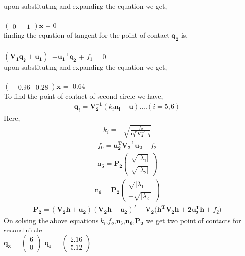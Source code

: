 \documentclass[journal,12pt,twocolumn]{IEEEtran}
\newcommand{\myvec}[1]{\ensuremath{\begin{pmatrix}#1\end{pmatrix}}}
\let\vec\mathbf
\begin{document}
upon substituting and expanding the equation we get, \\ \\
\hspace*{2cm}$\myvec{0 & -1}\vec{x}$ = 0 \\

finding the equation of tangent for the point of contact $\vec{q_2}$ is, \\ \\
\hspace*{2cm}$(\vec{V_1}\vec{q_2}+\vec{u_1})^{\top}$+$\vec{u_1}^{\top}\vec{q_2}$ + $f_1$ = 0 \\

upon substituting and expanding the equation we get, \\ \\
\hspace*{2cm}$\myvec{-0.96 & 0.28}\vec{x}$ = -0.64 \\

To find the point of contact of second circle we have, \\
\begin{align}
\boxed{\vec{q}_i = \vec{V_2^{-1}}(k_i\vec{n_i-u})}....(i = 5,6) 
\end{align}
Here, 
\begin{align}
k_i = \pm\sqrt{\frac{f_0}{\vec{n_i^TV_2^{-1}n_i}}}
\end{align}
\begin{align}
f_0 = \vec{u_2^TV_2^{-1}u_2}-f_2
\end{align}
\begin{align}
\vec{n_5} = \vec{P_2}\myvec{\sqrt{|\lambda_1|} \\ \sqrt{|\lambda_2|}}
\end{align}
\begin{align}
\vec{n_6} = \vec{P_2}\myvec{\sqrt{|\lambda_1|} \\ -\sqrt{|\lambda_2|}}
\end{align}
\begin{align}
\vec{P_2} = (\vec{V_2h+u_2})(\vec{V_2h+u_2})^T-\vec{V_2(h^TV_2h+2u_2^Th}+f_2)
\end{align}
On solving the above equations ${k_i}$,${f_o}$,$\vec{n_5}$,$\vec{n_6}$,$\vec{P_2}$ we get two point of contacts for second circle \\

\hspace*{1.5cm}$\vec{q_3}$ = $\myvec{6 \\ 0}$
$\vec{q_4}$ = $\myvec{2.16 \\ 5.12}$ \\
\end{document}
